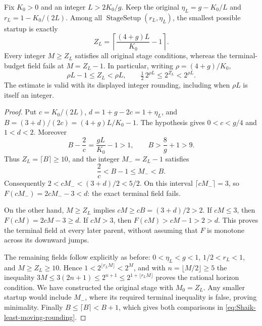 \begin{proposition}
\label{prop:Shaik-least-moving-startup}
Fix \(K_0>0\) and an integer \(L>2K_0/g\). Keep the original
\(\eta_L=g-K_0/L\) and \(r_L=1-K_0/(2L)\). Among all
\(\operatorname{StageSetup}(r_L,\eta_L)\), the smallest possible
startup is exactly
\begin{equation}\label{eq:Shaik-least-moving-startup}
 Z_L=\left\lceil\frac{(4+g)L}{K_0}-1\right\rceil .
\end{equation}
Every integer \(M\ge Z_L\) satisfies all original stage conditions,
whereas the terminal-budget field fails at \(M=Z_L-1\).
In particular, writing \(\rho=(4+g)/K_0\),
\begin{equation}\label{eq:Shaik-least-moving-rounding}
 \rho L-1\le Z_L<\rho L,\qquad
 \tfrac12\,2^{\rho L}\le2^{Z_L}<2^{\rho L}.
\end{equation}
The estimate is valid with its displayed integer rounding, including
when \(\rho L\) is itself an integer.
\end{proposition}
\begin{proof}
Put \(c=K_0/(2L)\), \(d=1+g-2c=1+\eta_L\), and
\(B=(3+d)/(2c)= (4+g)L/K_0-1\).
The hypothesis gives \(0<c<g/4\) and \(1<d<2\).
Moreover
\[
 B-\frac2c=\frac{gL}{K_0}-1>1,\qquad
 B>\frac{8}{g}+1>9.
\]
Thus \(Z_L=\lceil B\rceil\ge10\), and the integer
\(M_-=Z_L-1\) satisfies
\[
 \frac2c < B-1\le M_-<B.
\]
Consequently \(2<cM_-<(3+d)/2<5/2\).
On this interval \(\lceil cM_-\rceil=3\), so
\(F(cM_-)=2cM_--3<d\): the exact terminal field fails.

On the other hand, \(M\ge Z_L\) implies
\(cM\ge cB=(3+d)/2>2\). If \(cM\le3\), then
\(F(cM)=2cM-3\ge d\). If \(cM>3\), then
\(F(cM)>cM-1>2>d\). This proves the terminal field at
every later parent, without assuming that \(F\) is monotone
across its downward jumps.

The remaining fields follow explicitly as before:
\(0<\eta_L<g<1\), \(1/2<r_L<1\), and \(M\ge Z_L\ge10\).
Hence \(1<2^{\lfloor r_LM\rfloor}<2^M\), and with
\(n=\lfloor M/2\rfloor\ge5\) the inequality
\(3M\le3(2n+1)\le2^{n+1}\le2^{1+\lfloor r_LM\rfloor}\)
proves the rational horizon condition. We have constructed
the original stage with \(M_0=Z_L\).
Any smaller startup would include \(M_-\), where its required
terminal inequality is false, proving minimality.
Finally \(B\le\lceil B\rceil<B+1\), which gives both
comparisons in \eqref{eq:Shaik-least-moving-rounding}.
\end{proof}

